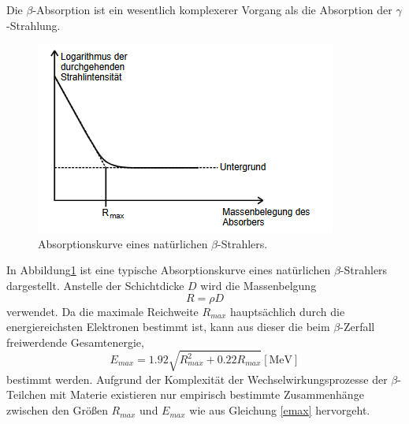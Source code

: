 Die $\beta$-Absorption ist ein wesentlich komplexerer Vorgang als die Absorption der $\gamma$-Strahlung.
\begin{figure}[H]
    \centering
    \includegraphics[scale=0.7]{content/Absorbbeta.png}
    \caption{Absorptionskurve eines natürlichen $\beta$-Strahlers. \cite{v704}}
    \label{fig:abs}
\end{figure}
\noindent
In Abbildung\ref{fig:abs} ist eine typische Absorptionskurve eines natürlichen $\beta$-Strahlers dargestellt.
Anstelle der Schichtdicke $D$ wird die Massenbelgung
\begin{equation}
  R = \rho D
\end{equation}
verwendet.
Da die maximale Reichweite $R_{max}$ hauptsächlich durch die energiereichsten Elektronen bestimmt ist, kann aus dieser die beim $\beta$-Zerfall freiwerdende Gesamtenergie,
\begin{equation}
    \label{emax}
  E_{max}= 1.92  \sqrt{R_{max}^2 +0.22R_{max}} [\si{\mega\electronvolt}]
\end{equation}
bestimmt werden.
Aufgrund der Komplexität der Wechselwirkungsprozesse der $\beta$-Teilchen mit Materie existieren nur empirisch bestimmte Zusammenhänge zwischen den Größen $R_{max}$ und $E_{max}$ wie aus Gleichung \eqref{emax} hervorgeht.
